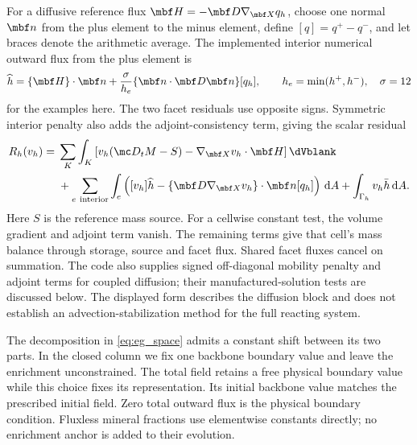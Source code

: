 \documentclass[11pt]{article}
\begin{document}
For a diffusive reference flux \(\mbf H=-\mbf D\nabla_{\mbf X}q_h\), choose one normal \(\mbf n\) from the plus element to the minus element, define \([q]=q^+-q^-\), and let braces denote the arithmetic average. The implemented interior numerical outward flux from the plus element is
\begin{equation}
 \widehat h=\{\mbf H\}\cdot\mbf n+
 \frac{\sigma}{h_e}\{\mbf n\cdot\mbf D\mbf n\}[q_h],
 \qquad h_e=\min(h^+,h^-),\quad \sigma=12
 \label{eq:eg_flux}
\end{equation}
for the examples here. The two facet residuals use opposite signs. Symmetric interior penalty also adds the adjoint-consistency term, giving the scalar residual
\begin{align}
 R_h(v_h)={}&\sum_K\int_K
 \left[v_h(\mc D_tM-S)-\nabla_{\mbf X}v_h\cdot\mbf H\right]\dVblank\notag\\
 &+\sum_{e\ \text{interior}}\int_e
 \left([v_h]\widehat h-\{\mbf D\nabla_{\mbf X}v_h\}\cdot\mbf n[q_h]\right)\,{\rm d}A
 +\int_{\Gamma_h}v_h\bar h\,{\rm d}A.
 \label{eq:eg_residual}
\end{align}
Here \(S\) is the reference mass source. For a cellwise constant test, the volume gradient and adjoint term vanish. The remaining terms give that cell's mass balance through storage, source and facet flux. Shared facet fluxes cancel on summation. The code also supplies signed off-diagonal mobility penalty and adjoint terms for coupled diffusion; their manufactured-solution tests are discussed below. The displayed form describes the diffusion block and does not establish an advection-stabilization method for the full reacting system.

The decomposition in \eqref{eq:eg_space} admits a constant shift between its two parts. In the closed column we fix one backbone boundary value and leave the enrichment unconstrained. The total field retains a free physical boundary value while this choice fixes its representation. Its initial backbone value matches the prescribed initial field. Zero total outward flux is the physical boundary condition. Fluxless mineral fractions use elementwise constants directly; no enrichment anchor is added to their evolution.
\end{document}
